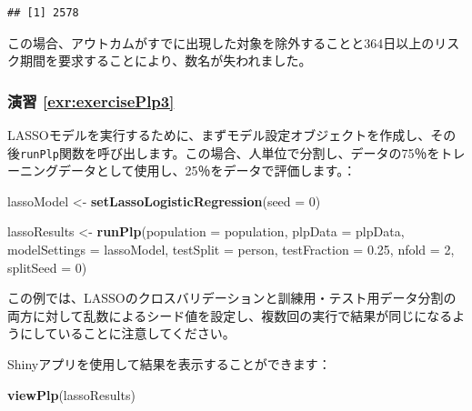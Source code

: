 \documentclass[
  11pt]{book}
\newenvironment{Shaded}{\begin{snugshade}}{\end{snugshade}}
\newcommand{\AttributeTok}[1]{\textcolor[rgb]{0.13,0.29,0.53}{#1}}
\newcommand{\DecValTok}[1]{\textcolor[rgb]{0.00,0.00,0.81}{#1}}
\newcommand{\FloatTok}[1]{\textcolor[rgb]{0.00,0.00,0.81}{#1}}
\newcommand{\FunctionTok}[1]{\textcolor[rgb]{0.13,0.29,0.53}{\textbf{#1}}}
\newcommand{\NormalTok}[1]{#1}
\newcommand{\OtherTok}[1]{\textcolor[rgb]{0.56,0.35,0.01}{#1}}
\newcommand{\StringTok}[1]{\textcolor[rgb]{0.31,0.60,0.02}{#1}}
\theoremstyle{definition}
\theoremstyle{definition}
\theoremstyle{definition}
\theoremstyle{definition}
\theoremstyle{remark}
\begin{document}
\begin{verbatim}
## [1] 2578
\end{verbatim}

この場合、アウトカムがすでに出現した対象を除外することと364日以上のリスク期間を要求することにより、数名が失われました。

\subsubsection*{演習 \ref{exr:exercisePlp3}}\label{ux6f14ux7fd2-refexrexerciseplp3}

LASSOモデルを実行するために、まずモデル設定オブジェクトを作成し、その後\texttt{runPlp}関数を呼び出します。この場合、人単位で分割し、データの75％をトレーニングデータとして使用し、25％をデータで評価します。：

\begin{Shaded}
\begin{Highlighting}[]
\NormalTok{lassoModel }\OtherTok{\textless{}{-}} \FunctionTok{setLassoLogisticRegression}\NormalTok{(}\AttributeTok{seed =} \DecValTok{0}\NormalTok{)}

\NormalTok{lassoResults }\OtherTok{\textless{}{-}} \FunctionTok{runPlp}\NormalTok{(}\AttributeTok{population =}\NormalTok{ population,}
                       \AttributeTok{plpData =}\NormalTok{ plpData,}
                       \AttributeTok{modelSettings =}\NormalTok{ lassoModel,}
                       \AttributeTok{testSplit =} \StringTok{\textquotesingle{}person\textquotesingle{}}\NormalTok{,}
                       \AttributeTok{testFraction =} \FloatTok{0.25}\NormalTok{,}
                       \AttributeTok{nfold =} \DecValTok{2}\NormalTok{,}
                       \AttributeTok{splitSeed =} \DecValTok{0}\NormalTok{)}
\end{Highlighting}
\end{Shaded}

この例では、LASSOのクロスバリデーションと訓練用・テスト用データ分割の両方に対して乱数によるシード値を設定し、複数回の実行で結果が同じになるようにしていることに注意してください。

Shinyアプリを使用して結果を表示することができます：

\begin{Shaded}
\begin{Highlighting}[]
\FunctionTok{viewPlp}\NormalTok{(lassoResults)}
\end{Highlighting}
\end{Shaded}
\end{document}
